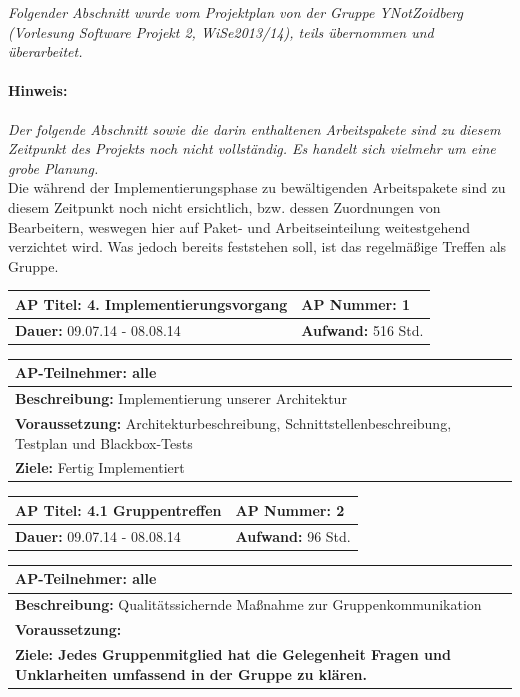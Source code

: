 \documentclass[fontsize=12pt,paper=a4,twoside]{scrartcl}
\begin{document}
\textit{Folgender Abschnitt wurde vom Projektplan von der Gruppe YNotZoidberg (Vorlesung Software Projekt 2, WiSe2013/14), teils übernommen und überarbeitet.}

\paragraph{Hinweis:} \textit{Der folgende Abschnitt sowie die darin enthaltenen Arbeitspakete sind zu diesem Zeitpunkt des Projekts noch nicht vollständig. Es handelt sich vielmehr um eine grobe Planung.}\\

Die während der Implementierungsphase zu bewältigenden Arbeitspakete sind zu diesem Zeitpunkt noch nicht ersichtlich, bzw. dessen Zuordnungen von Bearbeitern, weswegen hier auf Paket- und Arbeitseinteilung weitestgehend verzichtet wird. Was jedoch bereits feststehen soll, ist das regelmäßige Treffen als Gruppe. 

\begin{tabular}{|p{7.43cm}|p{7.43cm}|}
\hline
\textbf{AP Titel: }4. Implementierungsvorgang & \textbf{AP Nummer: }1\\ 
\hline
\textbf{Dauer: }09.07.14 - 08.08.14& \textbf{Aufwand: } 516 Std.\\
\hline
\end{tabular}
\begin{tabular}{|p{15.3cm}|}
\hline
\textbf{AP-Teilnehmer: }alle\\
\hline
\textbf{Beschreibung: }Implementierung unserer Architektur\\
\hline
\textbf{Voraussetzung: }Architekturbeschreibung, Schnittstellenbeschreibung, Testplan und Blackbox-Tests \\
\hline 
\textbf{Ziele: }Fertig Implementiert\\
\hline 
\end{tabular}


\begin{tabular}{|p{7.43cm}|p{7.43cm}|}
\hline
\textbf{AP Titel: }4.1 Gruppentreffen & \textbf{AP Nummer: }2\\ 
\hline
\textbf{Dauer: }09.07.14 - 08.08.14& \textbf{Aufwand: } 96 Std.\\
\hline
\end{tabular}
\begin{tabular}{|p{15.3cm}|}
\hline
\textbf{AP-Teilnehmer: }alle\\
\hline
\textbf{Beschreibung: }Qualitätssichernde Maßnahme zur Gruppenkommunikation\\
\hline
\textbf{Voraussetzung: } \\
\hline 
\textbf{Ziele: Jedes Gruppenmitglied hat die Gelegenheit Fragen und Unklarheiten umfassend in der Gruppe zu klären.}\\
\hline 
\end{tabular}
\end{document}
